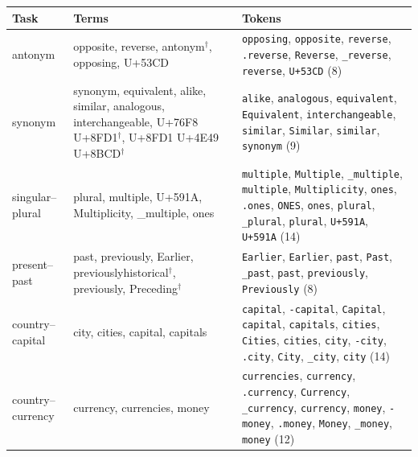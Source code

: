 \begin{center}\footnotesize\frenchspacing
\begin{tabular}{@{}l>{\raggedright}p{}>{\raggedright\arraybackslash}p{}@{}}
\toprule
Task & Terms & Tokens \\
\midrule
antonym & opposite, reverse, antonym$^\dagger$, opposing, \textrm{U+53CD} & \texttt{\textvisiblespace{}opposing}, \texttt{\textvisiblespace{}opposite}, \texttt{\textvisiblespace{}reverse}, \texttt{.reverse}, \texttt{Reverse}, \texttt{\_reverse}, \texttt{reverse}, \texttt{\textrm{U+53CD}} (8) \\[2pt]
synonym & synonym, equivalent, alike, similar, analogous, interchangeable, \textrm{U+76F8} \textrm{U+8FD1}$^\dagger$, \textrm{U+8FD1} \textrm{U+4E49} \textrm{U+8BCD}$^\dagger$ & \texttt{\textvisiblespace{}alike}, \texttt{\textvisiblespace{}analogous}, \texttt{\textvisiblespace{}equivalent}, \texttt{Equivalent}, \texttt{\textvisiblespace{}interchangeable}, \texttt{\textvisiblespace{}similar}, \texttt{Similar}, \texttt{similar}, \texttt{\textvisiblespace{}synonym} (9) \\[2pt]
singular--plural & plural, multiple, \textrm{U+591A}, Multiplicity, \_multiple, ones & \texttt{\textvisiblespace{}multiple}, \texttt{Multiple}, \texttt{\_multiple}, \texttt{multiple}, \texttt{Multiplicity}, \texttt{\textvisiblespace{}ones}, \texttt{.ones}, \texttt{ONES}, \texttt{ones}, \texttt{\textvisiblespace{}plural}, \texttt{\_plural}, \texttt{plural}, \texttt{\textvisiblespace{}\textrm{U+591A}}, \texttt{\textrm{U+591A}} (14) \\[2pt]
present--past & past, previously, Earlier, previouslyhistorical$^\dagger$, previously, Preceding$^\dagger$ & \texttt{\textvisiblespace{}Earlier}, \texttt{Earlier}, \texttt{\textvisiblespace{}past}, \texttt{Past}, \texttt{\_past}, \texttt{past}, \texttt{\textvisiblespace{}previously}, \texttt{Previously} (8) \\[2pt]
country--capital & city, cities, capital, capitals & \texttt{\textvisiblespace{}capital}, \texttt{-capital}, \texttt{Capital}, \texttt{capital}, \texttt{\textvisiblespace{}capitals}, \texttt{\textvisiblespace{}cities}, \texttt{Cities}, \texttt{cities}, \texttt{\textvisiblespace{}city}, \texttt{-city}, \texttt{.city}, \texttt{City}, \texttt{\_city}, \texttt{city} (14) \\[2pt]
country--currency & currency, currencies, money & \texttt{\textvisiblespace{}currencies}, \texttt{\textvisiblespace{}currency}, \texttt{.currency}, \texttt{Currency}, \texttt{\_currency}, \texttt{currency}, \texttt{\textvisiblespace{}money}, \texttt{-money}, \texttt{.money}, \texttt{Money}, \texttt{\_money}, \texttt{money} (12) \\[2pt]

\end{tabular}
\end{center}
